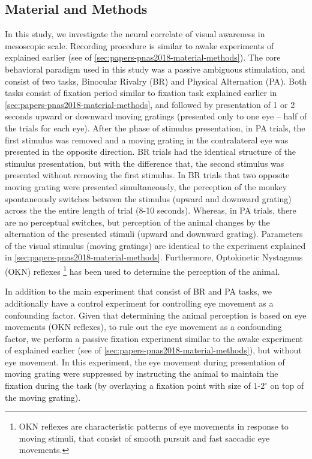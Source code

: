 \subsection*{Material and Methods}\label{sec:papers-biorxiv2020-material-methods}
In this study, we investigate the neural correlate of visual awareness in mesoscopic scale.
Recording procedure is similar to awake experiments of  explained earlier (see \matmet of \autoref{sec:papers-pnas2018-material-methods}).
The core behavioral paradigm used in this study was a passive ambiguous stimulation, 
and consist of two tasks, Binocular Rivalry (BR) and Physical Alternation (PA).
Both tasks consist of fixation period similar to fixation task explained earlier in \autoref{sec:papers-pnas2018-material-methods},
and followed by presentation of 1 or 2 seconds  upward or downward moving gratings
(presented only to one eye -- half of the trials for each eye).
After the phase of stimulus presentation,
in PA trials, the first stimulus was removed and a moving grating in the contralateral eye was presented in the opposite direction.
BR trials had the identical structure of the stimulus presentation,
but with the difference that, the second stimulus was presented without removing the first stimulus.
In BR trials that two opposite moving grating were presented simultaneously, 
the perception of the monkey spontaneously switches between the stimulus
(\ie upward and downward grating) across the the entire length of trial (8-10 seconds).
Whereas, in PA trials, there are no perceptual switches,  but perception of the animal changes by the alternation of the presented stimuli (upward and downward grating).
Parameters of the visual stimulus (moving gratings) are identical to the experiment explained in \autoref{sec:papers-pnas2018-material-methods}.
Furthermore, Optokinetic Nystagmus (OKN) reflexes
\footnote{
  OKN reflexes are characteristic patterns of eye movements in response to moving stimuli,
  that consist of smooth pursuit and fast saccadic eye movements.}
has been used to determine the perception of the animal.

In addition to the main experiment that consist of BR and PA tasks,
we additionally have a control experiment for controlling eye movement as a confounding factor.
Given that determining the animal perception is based on eye movements (OKN reflexes),
to rule out the eye movement as a confounding factor,
we perform a passive fixation experiment similar to the awake experiment of  explained earlier (see \matmet of \autoref{sec:papers-pnas2018-material-methods}), but without eye movement.
In this experiment, the eye movement during presentation of moving grating were suppressed by instructing the animal to maintain the fixation during the task
(by overlaying a fixation point with size of $1$-$2^\circ$ on top of the moving grating).

